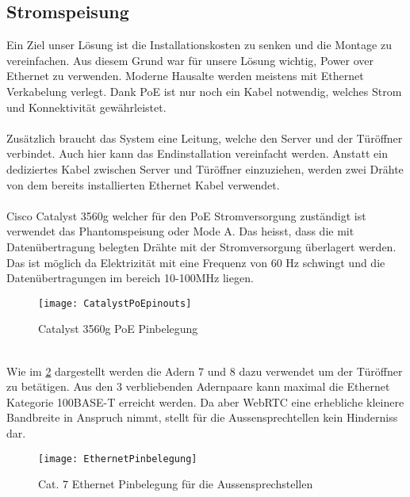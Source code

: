 \subsection{Stromspeisung}
\label{sec:poe}
Ein Ziel unser Lösung ist die Installationskosten zu senken und die Montage zu vereinfachen. Aus diesem Grund war für unsere Lösung wichtig, Power over Ethernet zu verwenden.
Moderne Hausalte werden meistens mit Ethernet Verkabelung verlegt. Dank PoE ist nur noch ein Kabel notwendig, welches Strom und Konnektivität gewährleistet.
\\
\\
Zusätzlich braucht das System eine Leitung, welche den Server und der Türöffner verbindet.
Auch hier kann das Endinstallation vereinfacht werden. Anstatt ein dediziertes Kabel zwischen Server und Türöffner einzuziehen, werden zwei Drähte von dem bereits installierten Ethernet Kabel verwendet.
\\
\\
Cisco Catalyst 3560g welcher für den PoE Stromversorgung zuständigt ist verwendet das Phantomspeisung oder Mode A. Das heisst, dass die mit Datenübertragung belegten Drähte mit der Stromversorgung überlagert werden. Das ist möglich da Elektrizität mit eine Frequenz von 60 Hz schwingt und die Datenübertragungen im bereich 10-100MHz liegen.
\begin{figure}[htb!]
	\begin{center}
		\texttt{[image: CatalystPoEpinouts]}
		\caption[Catalyst Pinouts]{Catalyst 3560g PoE Pinbelegung}
		\label{fig:catalystPinouts}
	\end{center}
\end{figure}
\\
Wie im \cref{fig:ethernetBelegung} dargestellt werden die Adern 7 und 8 dazu verwendet um der Türöffner zu betätigen. Aus den 3 verbliebenden Adernpaare kann maximal die Ethernet Kategorie 100BASE-T erreicht werden. Da aber WebRTC eine erhebliche kleinere Bandbreite in Anspruch nimmt, stellt für die Aussensprechtellen kein Hinderniss dar.

\begin{figure}[htb!]
	\begin{center}
		\texttt{[image: EthernetPinbelegung]}
		\caption[EthernetPinbelegung]{Cat. 7 Ethernet Pinbelegung für die Aussensprechstellen}
		\label{fig:ethernetBelegung}
	\end{center}
\end{figure}



